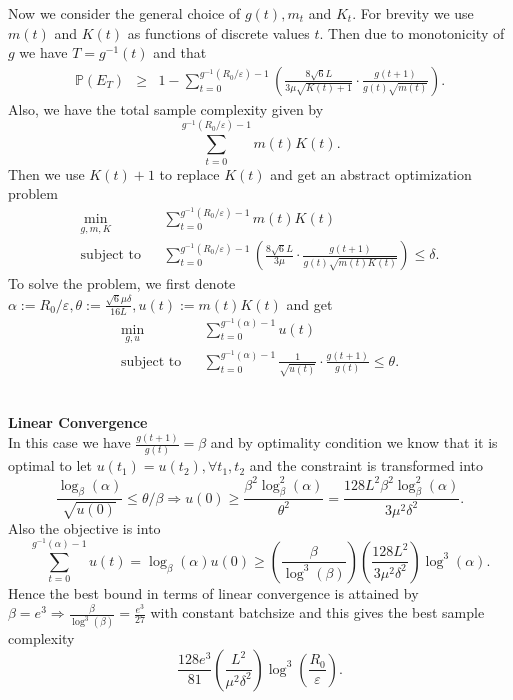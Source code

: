 \documentclass{article}
\newcommand{\assign}{:=}
\newcommand{\cdummy}{\cdot}
\newcommand{\tmstrong}[1]{\textbf{#1}}
\begin{document}
Now we consider the general choice of $g (t), m_t$ and $K_t$. For brevity we
use $m (t)$ and $K (t)$ as functions of discrete values $t$. Then due to
monotonicity of $g$ we have $T = g^{- 1} (t)$ and that
\begin{eqnarray*}
  \mathbb{P} (E_T) & \geq & 1 - \sum_{t = 0}^{g^{- 1} (R_0 / \varepsilon) - 1}
  \left( \frac{8 \sqrt{6} L}{3 \mu \sqrt{K (t) + 1}} \cdummy \frac{g (t +
  1)}{g (t) \sqrt{m (t)}} \right) .
\end{eqnarray*}
Also, we have the total sample complexity given by
\[ \sum_{t = 0}^{g^{- 1} (R_0 / \varepsilon) - 1} m (t) K (t) . \]
Then we use $K (t) + 1$ to replace $K (t)$ and get an abstract optimization
problem
\begin{eqnarray*}
  \min_{g, m, K} & &\sum_{t = 0}^{g^{- 1} (R_0 / \varepsilon) - 1} m (t) K (t)
  \\
  \text{subject to} & &\sum_{t = 0}^{g^{- 1} (R_0 / \varepsilon) - 1} \left(
  \frac{8 \sqrt{6} L}{3 \mu} \cdummy \frac{g (t + 1)}{g (t) \sqrt{m (t) K
  (t)}} \right) \leq \delta.
\end{eqnarray*}
To solve the problem, we first denote $\alpha \assign R_0 / \varepsilon,
\theta \assign \frac{\sqrt{6} \mu \delta}{16 L}, u (t) \assign m (t) K (t)$
and get
\begin{eqnarray*}
  \min_{g, u} & &\sum_{t = 0}^{g^{- 1} (\alpha) - 1} u (t)\\
  \text{subject to} & & \sum_{t = 0}^{g^{- 1} (\alpha) - 1} \frac{1}{\sqrt{u
  (t)}} \cdummy \frac{g (t + 1)}{g (t)} \leq \theta.
\end{eqnarray*}\

{\tmstrong{Linear Convergence}}\\

In this case we have $\frac{g (t + 1)}{g (t)} = \beta$ and by optimality
condition we know that it is optimal to let $u (t_1) = u (t_2), \forall t_1,
t_2$ and the constraint is transformed into
\[ \frac{\log_{\beta} (\alpha)}{\sqrt{u (0)}} \leq \theta / \beta \Rightarrow
   u (0) \geq \frac{\beta^2 \log^2_{\beta} (\alpha)}{\theta^2} = \frac{128 L^2
   \beta^2 \log^2_{\beta} (\alpha)}{3 \mu^2 \delta^2} . \]
Also the objective is into
\[ \sum_{t = 0}^{g^{- 1} (\alpha) - 1} u (t) = \log_{\beta} (\alpha) u (0)
   \geq \left( \frac{\beta}{\log^3 (\beta)} \right) \left( \frac{128 L^2}{3
   \mu^2 \delta^2} \right) \log^3 (\alpha) . \]
Hence the best bound in terms of linear convergence is attained by $\beta =
e^3 \Rightarrow \frac{\beta}{\log^3 (\beta)} = \frac{e^3}{27}$ with constant
batchsize and this gives the best sample complexity
\[ \frac{128 e^3}{81} \left( \frac{L^2}{\mu^2 \delta^2} \right) \log^3 \left(
   \frac{R_0}{\varepsilon} \right) . \]\\
   
\end{document}
